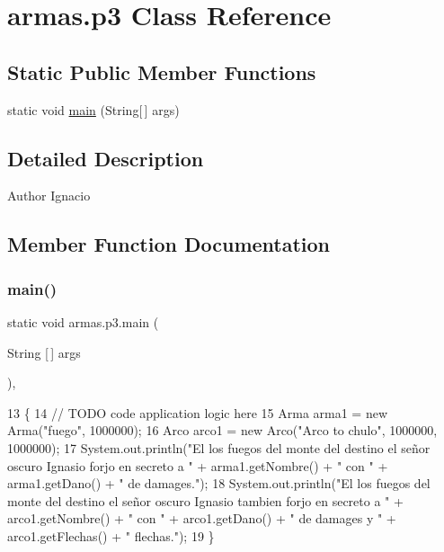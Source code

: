 \hypertarget{classarmas_1_1p3}{}\section{armas.\+p3 Class Reference}
\label{classarmas_1_1p3}
\subsection*{Static Public Member Functions}
\begin{DoxyCompactItemize}
\item 
static void \mbox{\hyperlink{classarmas_1_1p3_a68a7de0cc4a4edb0079f9c74f44ac0ba}{main}} (String\mbox{[}$\,$\mbox{]} args)
\end{DoxyCompactItemize}


\subsection{Detailed Description}
\begin{DoxyAuthor}{Author}
Ignacio 
\end{DoxyAuthor}


\subsection{Member Function Documentation}
\mbox{\label{classarmas_1_1p3_a68a7de0cc4a4edb0079f9c74f44ac0ba}} 
\subsubsection{\texorpdfstring{main()}{main()}}
{\footnotesize\ttfamily static void armas.\+p3.\+main (\begin{DoxyParamCaption}\item[{String \mbox{[}$\,$\mbox{]}}]{args }\end{DoxyParamCaption})\hspace{0.3cm}{\ttfamily [inline]}, {\ttfamily [static]}}


\begin{DoxyCode}
13                                            \{
14         \textcolor{comment}{// TODO code application logic here}
15         Arma arma1 = \textcolor{keyword}{new} Arma(\textcolor{stringliteral}{"fuego"}, 1000000);
16         Arco arco1 = \textcolor{keyword}{new} Arco(\textcolor{stringliteral}{"Arco to chulo"}, 1000000, 1000000);
17         System.out.println(\textcolor{stringliteral}{"El los fuegos del monte del destino el señor oscuro Ignasio forjo en secreto a 
      "} + arma1.getNombre() + \textcolor{stringliteral}{" con "} + arma1.getDano() + \textcolor{stringliteral}{" de damages."});
18         System.out.println(\textcolor{stringliteral}{"El los fuegos del monte del destino el señor oscuro Ignasio tambien forjo en
       secreto a "} + arco1.getNombre() + \textcolor{stringliteral}{" con "} + arco1.getDano() + \textcolor{stringliteral}{" de damages y "} + arco1.getFlechas() + \textcolor{stringliteral}{"
       flechas."});
19     \}
\end{DoxyCode}

